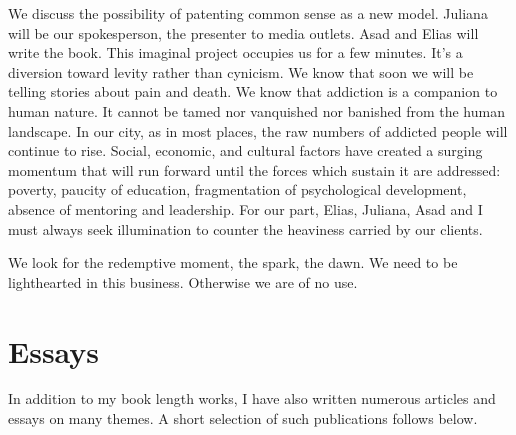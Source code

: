 \documentclass[10pt,DIV09,letterpaper,oneside,headsepline]{scrreprt}
\begin{document}
We discuss the possibility of patenting common sense as a new model. Juliana will be our spokesperson, the presenter to media outlets. Asad and Elias will write the book. This imaginal project occupies us for a few minutes. It's a diversion toward levity rather than cynicism. We know that soon we will be telling stories about pain and death. We know that addiction is a companion to human nature. It cannot be tamed nor vanquished nor banished from the human landscape. In our city, as in most places, the raw numbers of addicted people will continue to rise. Social, economic, and cultural factors have created a surging momentum that will run forward until the forces which sustain it are addressed: poverty, paucity of education, fragmentation of psychological development, absence of mentoring and leadership. For our part, Elias, Juliana, Asad and I must always seek illumination to counter the heaviness carried by our clients.

We look for the redemptive moment, the spark, the dawn. We need to be lighthearted in this business. Otherwise we are of no use.

\clearpage

\section{Essays}

In addition to my book length works, I have also written numerous articles and essays on many themes. A short selection of such publications follows below.
\end{document}
